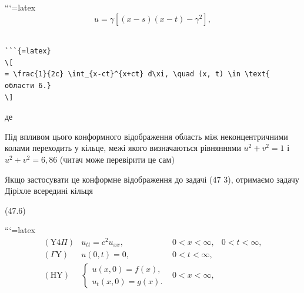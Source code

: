 \documentclass[
  ukrainian,
]{article}
\begin{document}
```{=latex}
\[
u = \gamma [(x-s)(x-t)-\gamma^2],
\]

\begin{verbatim}

```{=latex}
\[
= \frac{1}{2c} \int_{x-ct}^{x+ct} d\xi, \quad (x, t) \in \text{ области 6.}
\]
\end{verbatim}

де

Під впливом цього конформного відображення область між неконцентричними
колами переходить у кільце, межі якого визначаються рівняннями
\(u^2 + v^2 = 1\) і \(u^2 + v^2 = 6,86\) (читач може перевірити це сам)

Якщо застосувати це конформне відображення до задачі (47 3), отримаємо
задачу Діріхле всередині кільця

(47.6)

```{=latex}
\[
\begin{aligned} (\text{Y}4\Pi) & u_{tt} = c^2 u_{xx}, & 0 < x < \infty, & 0 < t < \infty, \\ (\Gamma \text{Y}) & u(0, t) = 0, & 0 < t < \infty, \\ (\text{H}\text{Y}) & \begin{cases} u(x, 0) = f(x), \\ u_t(x, 0) = g(x). \end{cases} & 0 < x < \infty, \\ \end{aligned}
\]
\end{document}
